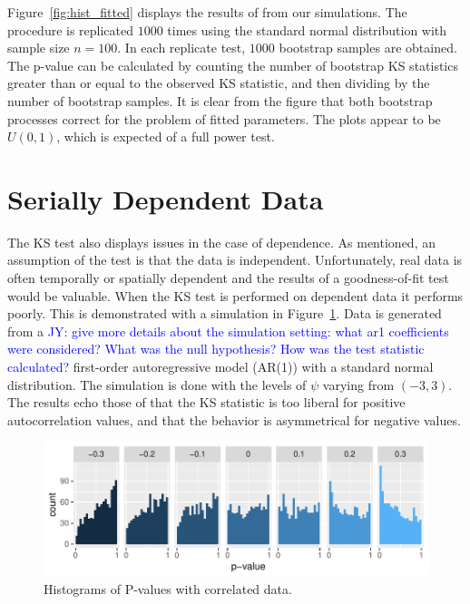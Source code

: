 \documentclass[12pt, letterpaper, titlepage]{article}
\newcommand{\jy}[1]{\textcolor{blue}{JY: #1}}
\begin{document}
Figure~\ref{fig:hist_fitted} displays the results of from our simulations. The procedure 
is replicated $1000$ times using the standard normal distribution with sample size $n=100$. 
In each replicate test, $1000$ bootstrap samples are obtained. The p-value can be calculated
by counting the number of bootstrap KS statistics greater than or equal to the observed KS statistic, 
and then dividing by the number of bootstrap samples. It is clear from the figure that both
bootstrap processes correct for the problem of fitted parameters. The plots appear to be
$U(0,1)$, which is expected of a full power test.

\section{Serially Dependent Data}\label{sec:dependence}

The KS test also displays issues in the case of dependence. As mentioned, an assumption of the 
test is that the data is independent. Unfortunately, real data is often temporally
or spatially dependent and the results of a goodness-of-fit test would be valuable. 
When the KS test is performed on dependent data it performs poorly. This is demonstrated
with a simulation in Figure~\ref{fig:hist_correlation}. Data is generated from a
\jy{give more details about the simulation setting: what ar1 coefficients were
  considered? What was the null hypothesis? How was the test statistic calculated?}
first-order autoregressive model (AR(1)) with a standard normal distribution. The simulation
is done with the levels of $\psi$ varying from $(-3,3)$. The results echo those of \citet{Durilleul}
that the KS statistic is too liberal for positive autocorrelation values, and 
that the behavior is asymmetrical for negative values.

\begin{figure}[tbp]
  \centering
  \includegraphics{hist_correlation}
  \caption{Histograms of P-values with correlated data.}
  \label{fig:hist_correlation}
\end{figure}
\end{document}
